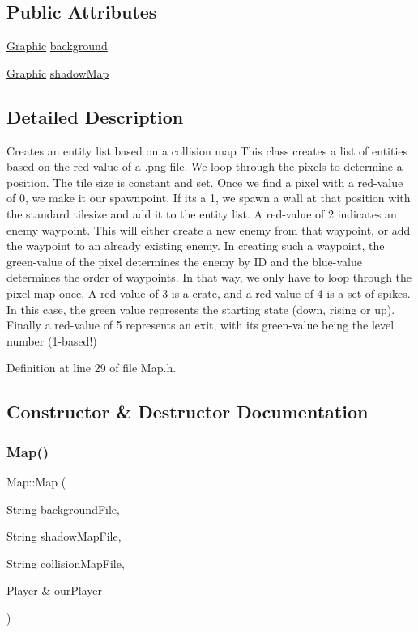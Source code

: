 \subsection*{Public Attributes}
\begin{DoxyCompactItemize}
\item 
\hyperlink{class_graphic}{Graphic} \hyperlink{class_map_ae0b54e9c9926c2b9a369e351a8f6e7b7}{background}
\item 
\hyperlink{class_graphic}{Graphic} \hyperlink{class_map_a444d10c1cf7a759976a72dcec8908e62}{shadow\+Map}
\end{DoxyCompactItemize}


\subsection{Detailed Description}
Creates an entity list based on a collision map This class creates a list of entities based on the red value of a .png-\/file. We loop through the pixels to determine a position. The tile size is constant and set. Once we find a pixel with a red-\/value of 0, we make it our spawnpoint. If it\textquotesingle{}s a 1, we spawn a wall at that position with the standard tilesize and add it to the entity list. A red-\/value of 2 indicates an enemy waypoint. This will either create a new enemy from that waypoint, or add the waypoint to an already existing enemy. In creating such a waypoint, the green-\/value of the pixel determines the enemy by ID and the blue-\/value determines the order of waypoints. In that way, we only have to loop through the pixel map once. A red-\/value of 3 is a crate, and a red-\/value of 4 is a set of spikes. In this case, the green value represents the starting state (down, rising or up). Finally a red-\/value of 5 represents an exit, with its green-\/value being the level number (1-\/based!) 

Definition at line 29 of file Map.\+h.



\subsection{Constructor \& Destructor Documentation}
\mbox{\label{class_map_a1b9128df3f2c9aa5ff56130a3530e8a1}} 
\subsubsection{\texorpdfstring{Map()}{Map()}}
{\footnotesize\ttfamily Map\+::\+Map (\begin{DoxyParamCaption}\item[{String}]{background\+File,  }\item[{String}]{shadow\+Map\+File,  }\item[{String}]{collision\+Map\+File,  }\item[{\hyperlink{class_player}{Player} \&}]{our\+Player }\end{DoxyParamCaption})}



